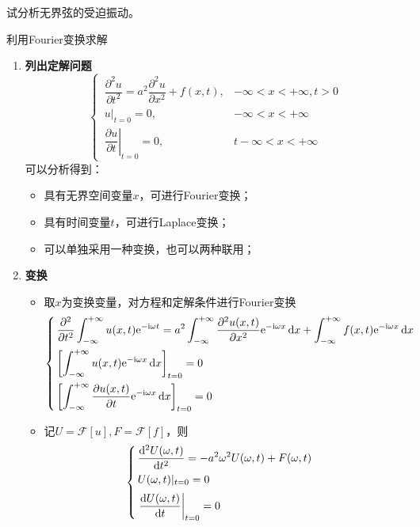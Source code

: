\example[无界弦的受迫振动]
试分析无界弦的受迫振动。

\solve 利用Fourier变换求解
\begin{enumerate}
	\item \textbf{列出定解问题}
	\begin{equation}
		\begin{cases}
			\, \dfrac{\partial^2 u}{\partial t^2} = a^2 \dfrac{\partial^2 u}{\partial x^2} + f(x,t), & -\infty < x< +\infty,t>0\\[0.5em]
			\, u|_{t = 0} = 0, & -\infty < x < + \infty\\[0.5em]
			\,\left. \dfrac{\partial u}{\partial t}\right|_{t = 0} = 0, & t-\infty < x < +\infty
		\end{cases}
	\end{equation}
	可以分析得到：
	\begin{itemize}
		\item 具有无界空间变量$x$，可进行Fourier变换；
		\item 具有时间变量$t$，可进行Laplace变换；
		\item 可以单独采用一种变换，也可以两种联用；
	\end{itemize}
	
	\item \textbf{变换}
	\begin{itemize}
		\item 取$x$为变换变量，对方程和定解条件进行Fourier变换
		\begin{equation}
			\begin{cases}
				\, \displaystyle \dfrac{\partial^2}{\partial t^2} \int_{-\infty}^{+\infty} u(x,t){\rm{e}}^{- {\rm{i}} \omega t} = a^2 \int_{- \infty}^{+\infty} \dfrac{\partial^2 u(x,t)}{\partial x^2} {\rm{e}}^{- {\rm{i}} \omega x}\,{\rm{d}} x + \int_{- \infty}^{+\infty} f(x,t) {\rm{e}}^{- {\rm{i}} \omega x}\,{\rm{d}} x\\[1em]
				\, \displaystyle \left[\int_{- \infty}^{+\infty}u(x,t){\rm{e}}^{-{\rm{i}} \omega x}\, {\rm{d}} x\right]_{t = 0} = 0\\[1em]
				\, \displaystyle \left[\int_{- \infty}^{+\infty} \dfrac{\partial u(x,t)}{\partial t}{\rm{e}}^{- {\rm{i}} \omega x}\, {\rm{d}} x\right]_{t = 0} = 0\,
			\end{cases}
		\end{equation}
		
		\item 记$U = \mathcal{F}[u], F= \mathcal{F}[f]$，则
		\begin{equation}
			\begin{cases}
				\, \displaystyle \dfrac{{\rm{d}}^2 U(\omega, t)}{{\rm{d}} t^2} = -a^2 \omega^2 U(\omega, t) + F(\omega, t)\\[0.5em]
				\, \displaystyle U(\omega, t)|_{t = 0} = 0\\[0.5em]
				\, \displaystyle \left. \dfrac{{\rm{d}} U(\omega, t)}{{\rm{d}} t} \right|_{t = 0} = 0
			\end{cases}
			\label{无界弦受迫振动}
		\end{equation}
	\end{itemize}
	

\end{enumerate}
